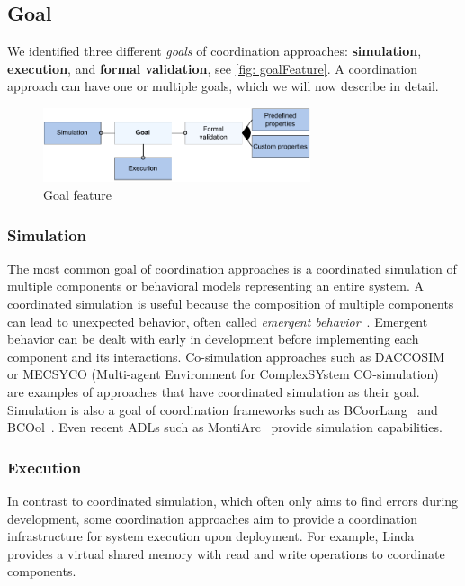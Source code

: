 \documentclass[runningheads]{llncs}
\begin{document}
\subsection{Goal} %
We identified three different \textit{goals} of coordination approaches: \textbf{simulation}, \textbf{execution}, and \textbf{formal validation}, see \autoref{fig: goalFeature}.
A coordination approach can have one or multiple goals, which we will now describe in detail.

\begin{figure}[ht]
	\centering
	\includegraphics[width=0.7\textwidth]{images/goal_feature}
	\caption{Goal feature}
	\label{fig: goalFeature}
\end{figure}

\subsubsection{Simulation} The most common goal of coordination approaches is a coordinated simulation of multiple components or behavioral models representing an entire system.
A coordinated simulation is useful because the composition of multiple components can lead to unexpected behavior, often called \textit{emergent behavior}~\cite{ekerTamingHeterogeneityPtolemy2003}.
Emergent behavior can be dealt with early in development before implementing each component and its interactions.
Co-simulation approaches such as DACCOSIM~\cite{galtierFMIBasedDistributedMultisimulation2015,dadSynthesisFeedbackDistribution2021} or MECSYCO (Multi-agent Environment for ComplexSYstem CO-simulation)~\cite{camusHybridCosimulationFMUs2016,camusCosimulationCyberphysicalSystems2018} are examples of approaches that have coordinated simulation as their goal.
Simulation is also a goal of coordination frameworks such as BCoorLang~\cite{krauterBehavioralConsistencyMultimodeling2023} and BCOol~\cite{varalarsenBehavioralCoordinationOperator2015}.
Even recent ADLs such as MontiArc~\cite{haberMontiArcArchitecturalModeling2014} provide simulation capabilities.

\subsubsection{Execution} In contrast to coordinated simulation, which often only aims to find errors during development, some coordination approaches aim to provide a coordination infrastructure for system execution upon deployment.
For example, Linda provides a virtual shared memory with read and write operations to coordinate components.
\end{document}
